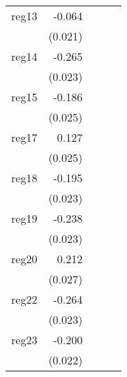 {\begin{longtable}{l*{4}{D{.}{.}{-1}}}
\addlinespace
reg13       &      -0.064\sym{**} &                     &                     &                     \\
            &     (0.021)         &                     &                     &                     \\
\addlinespace
reg14       &      -0.265\sym{***}&                     &                     &                     \\
            &     (0.023)         &                     &                     &                     \\
\addlinespace
reg15       &      -0.186\sym{***}&                     &                     &                     \\
            &     (0.025)         &                     &                     &                     \\
\addlinespace
reg17       &       0.127\sym{***}&                     &                     &                     \\
            &     (0.025)         &                     &                     &                     \\
\addlinespace
reg18       &      -0.195\sym{***}&                     &                     &                     \\
            &     (0.023)         &                     &                     &                     \\
\addlinespace
reg19       &      -0.238\sym{***}&                     &                     &                     \\
            &     (0.023)         &                     &                     &                     \\
\addlinespace
reg20       &       0.212\sym{***}&                     &                     &                     \\
            &     (0.027)         &                     &                     &                     \\
\addlinespace
reg22       &      -0.264\sym{***}&                     &                     &                     \\
            &     (0.023)         &                     &                     &                     \\
\addlinespace
reg23       &      -0.200\sym{***}&                     &                     &                     \\
            &     (0.022)         &                     &                     &                     \\

\end{longtable}}
